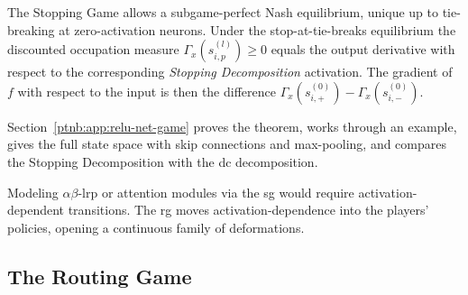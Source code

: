 \begin{theoremenv}\label{ptnb:thm:gradient}
The Stopping Game allows a subgame-perfect Nash equilibrium, unique up to tie-breaking at
zero-activation neurons.
Under the stop-at-tie-breaks equilibrium the discounted occupation measure $\Gamma_x(s_{i,p}^{(l)})
    \ge 0$ equals the output derivative with respect to the corresponding \emph{Stopping Decomposition}
activation.
The gradient of $f$ with respect to the input is then the difference $\Gamma_x(s_{i,+}^{(0)}) -
    \Gamma_x(s_{i,-}^{(0)})$.
\hfill{}
\end{theoremenv}
Section~\ref{ptnb:app:relu-net-game} proves the theorem, works through an example, gives the full state
space with skip connections and max-pooling, and compares the Stopping Decomposition with the
\ac{dc} decomposition.

Modeling $\alpha\beta$-\ac{lrp} or attention modules via the \ac{sg} would require
activation-dependent transitions. The \ac{rg} moves activation-dependence into the players'
policies, opening a continuous family of deformations.

\subsection{The Routing Game}\label{ptnb:sec:routing}\label{subsec:routing_game_def}

